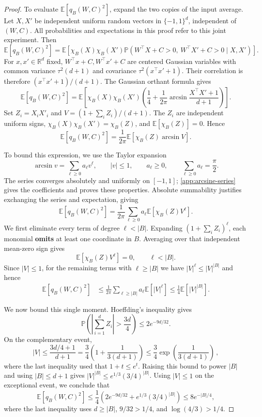 \documentclass[11pt,twoside]{article}
\newcommand{\E}{\mathbb E}
\renewcommand{\P}{\mathbb P}
\newcommand{\R}{\mathbb R}
\theoremstyle{definition}
\theoremstyle{remark}
\begin{document}
\begin{proof}
To evaluate $\E[q_B(W,C)^2]$, expand the two copies of the input average.
Let $X,X'$ be independent uniform random vectors in $\{-1,1\}^d$,
independent of $(W,C)$. All probabilities and expectations in this proof
refer to this joint experiment. Then
\[
\E[q_B(W,C)^2]
=\E\!\left[\chi_B(X)\chi_B(X')
\P(W^\top X+C>0,\ W^\top X'+C>0\mid X,X')\right].
\]
For $x,x'\in \R^d$ fixed, $W^\top x+C, W^\top x'+C$
are centered Gaussian variables with
common variance $\tau^2(d+1)$ and covariance $\tau^2(x^\top x'+1)$. Their
correlation is therefore $(x^\top x'+1)/(d+1)$. The Gaussian orthant formula
gives
\begin{equation}
\E[q_B(W,C)^2]
=\E\!\left[\chi_B(X)\chi_B(X')
\left(\frac14+\frac1{2\pi}\arcsin\frac{X^\top X'+1}{d+1}\right)\right].
\label{eq:orthant-expansion}
\end{equation}
Set $Z_i=X_iX'_i$ and $V=(1+\sum_iZ_i)/(d+1)$. The $Z_i$ are independent
uniform signs, $\chi_B(X)\chi_B(X')=\chi_B(Z)$, and
$\E[\chi_B(Z)]=0$. Hence
\[
\E[q_B(W,C)^2]=\frac1{2\pi}\E[\chi_B(Z)\arcsin V].
\]

To bound this expression, we use the Taylor expansion
\[
\arcsin v=\sum_{\ell\ge0}a_\ell v^\ell,
\qquad |v|\le1,\qquad
a_\ell\ge0,\qquad \sum_{\ell\ge0}a_\ell=\frac\pi2.
\]
The series converges absolutely and uniformly on $[-1,1]$;
\cref{app:arcsine-series} gives the coefficients and proves these properties.
Absolute summability justifies exchanging the series and expectation, giving
\[
\E[q_B(W,C)^2]
=\frac1{2\pi}\sum_{\ell\ge0}a_\ell\E[\chi_B(Z)V^\ell].
\]
We first eliminate every term of degree $\ell<|B|$. Expanding
$(1+\sum_i Z_i)^\ell$, each monomial \textbf{omits} at least one coordinate in $B$.
Averaging over that independent mean-zero sign gives
\begin{equation}
\E[\chi_B(Z)V^\ell]=0,\qquad \ell<|B|.
\label{eq:degree-cancellation}
\end{equation}
Since $|V|\le1$, for the remaining terms
with $\ell \ge |B|$ we have $|V|^\ell \le |V|^{|B|}$ and hence
\begin{align*}
\E[q_B(W,C)^2]
&\le\frac1{2\pi}\sum_{\ell\ge|B|}a_\ell\E[|V|^\ell]
\le\frac14\E[|V|^{|B|}].
\end{align*}

We now bound this single moment. Hoeffding's inequality gives
\[
\P\!\left(\left|\sum_{i=1}^dZ_i\right|>\frac{3d}{4}\right)
\le2e^{-9d/32}.
\]
On the complementary event,
\[
|V|\le\frac{3d/4+1}{d+1}
=\frac34\left(1+\frac1{3(d+1)}\right)
\le \frac34 \exp(\frac1{3(d+1)})\,,
\]
where the last inequality used that $1+t \le e^t$.
Raising this bound to power $|B|$ and using $|B|\le d+1$ gives
$|V|^{|B|}\le e^{1/3}(3/4)^{|B|}$. Using $|V|\le1$ on the exceptional
event, we conclude that
\[
\E[q_B(W,C)^2]
\le\frac14\left(2e^{-9d/32}+e^{1/3}(3/4)^{|B|}\right)
\le8e^{-|B|/4},
\]
where the last inequality uses $d\ge|B|$, $9/32>1/4$, and
$\log(4/3)>1/4$.
\end{proof}
\end{document}
